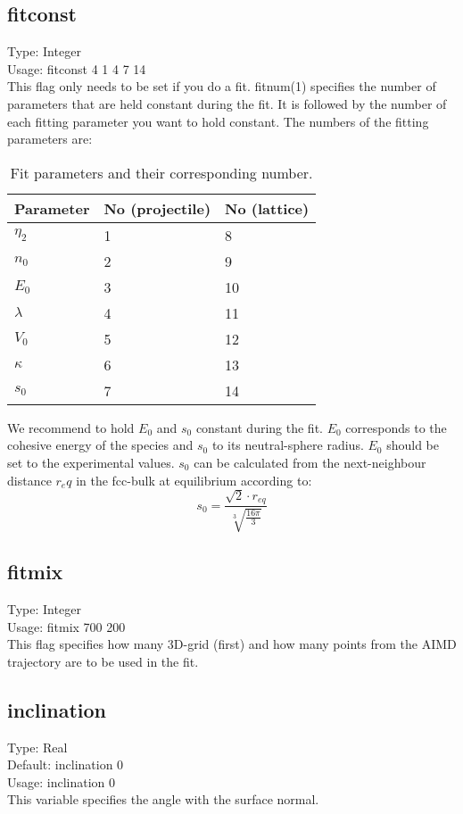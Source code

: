 \documentclass[twoside, 11pt, titlepage, captions=nooneline, a4paper, headsepline]{scrbook}%
\begin{document}
\subsection*{fitconst}
Type: Integer\\
Usage: fitconst 4 1 4 7 14\\
This flag only needs to be set if you do a fit. fitnum(1) specifies the number of parameters that are held constant during the fit. It is followed by the number of each fitting parameter you want to hold constant. The numbers of the fitting parameters are:
\begin{table}[h!]
\centering
\caption{Fit parameters and their corresponding number.}
\label{fitconst}
\begin{tabular}{p{2cm}p{5cm}p{5cm}}
\hline\hline
Parameter& No (projectile) & No (lattice)\\
\hline
$\eta_2$ & 1 & 8\\
$n_0$ & 2 & 9 \\
$E_0$ & 3 & 10 \\
$\lambda$ & 4 & 11 \\
$V_0$ & 5 & 12 \\
$\kappa$ & 6 & 13 \\
$s_0$ & 7 & 14 \\
\hline
\end{tabular}
\end{table}
We recommend to hold $E_0$ and $s_{0}$ constant during the fit. $E_0$ corresponds to the cohesive energy of the species and $s_0$ to its neutral-sphere radius. $E_0$ should be set to the experimental values. $s_0$ can be calculated from the next-neighbour distance $r_eq$ in the fcc-bulk at equilibrium according to:
\begin{equation}
s_0 = \frac{\sqrt{2}\cdot r_{eq}}{\sqrt[3]{\frac{16 \pi}{3}}}
\end{equation}
\subsection*{fitmix}
Type: Integer\\
Usage: fitmix 700 200\\
This flag specifies how many 3D-grid (first) and how many points from the AIMD trajectory are to be used in the fit.

\subsection*{inclination}
Type: Real\\
Default: inclination 0\\
Usage: inclination 0\\
This variable specifies the angle with the surface normal.
\end{document}
